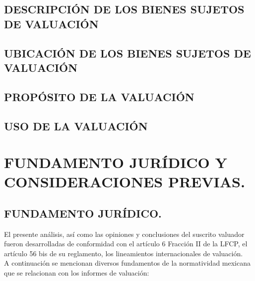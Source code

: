 \documentclass[10pt,letter]{report}
\begin{document}
\section{DESCRIPCI\'ON DE LOS BIENES SUJETOS DE VALUACI\'ON}\label{sec:f}


\section{UBICACI\'ON DE LOS BIENES SUJETOS DE VALUACI\'ON}\label{sec:g}


\section{PROP\'OSITO DE LA VALUACI\'ON}\label{sec:h}


\section{USO DE LA VALUACI\'ON}\label{sec:i}


\espacio{4cm}

\chapter{FUNDAMENTO JUR\'IDICO Y CONSIDERACIONES PREVIAS.}\label{cap:3}
\thispagestyle{fancy}
\setcounter{section}{9}

\section*{FUNDAMENTO JUR\'IDICO.}\label{sec:juridico}
El presente an\'alisis, as\'i como las opiniones y conclusiones del suscrito valuador fueron desarrolladas de conformidad con el art\'iculo 6 Fracci\'on II de la LFCP, el art\'iculo 56 bis de su reglamento, los lineamientos internacionales de valuaci\'on.\\

A continuaci\'on se mencionan diversos fundamentos de la normatividad mexicana que se relacionan con los informes de valuaci\'on:\\





%
\espacio{1cm}
\end{document}
